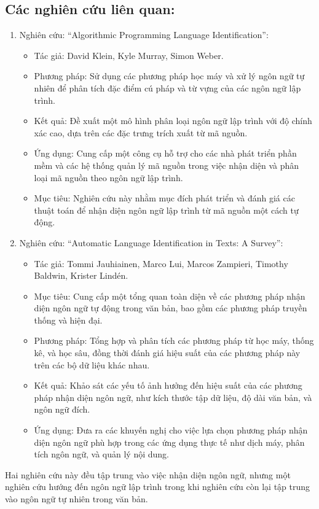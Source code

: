 \subsection{Các nghiên cứu liên quan:}

\begin{enumerate}
    \item Nghiên cứu: “Algorithmic Programming Language Identification”:
    \begin{itemize}
        \item Tác giả: David Klein, Kyle Murray, Simon Weber.
        \item  Phương pháp: Sử dụng các phương pháp học máy và xử lý ngôn ngữ tự nhiên để phân tích đặc điểm cú pháp và từ vựng của các ngôn ngữ lập trình.
        \item Kết quả: Đề xuất một mô hình phân loại ngôn ngữ lập trình với độ chính xác cao, dựa trên các đặc trưng trích xuất từ mã nguồn.
        \item  Ứng dụng: Cung cấp một công cụ hỗ trợ cho các nhà phát triển phần mềm và các hệ thống quản lý mã nguồn trong việc nhận diện và phân loại mã nguồn theo ngôn ngữ lập trình.
        \item Mục tiêu: Nghiên cứu này nhằm mục đích phát triển và đánh giá các thuật toán để nhận diện ngôn ngữ lập trình từ mã nguồn một cách tự động.
    \end{itemize}
    \item Nghiên cứu: “Automatic Language Identification in Texts: A Survey”:
    \begin{itemize}
        \item Tác giả: Tommi Jauhiainen, Marco Lui, Marcos Zampieri, Timothy Baldwin, Krister Lindén.
        \item Mục tiêu: Cung cấp một tổng quan toàn diện về các phương pháp nhận diện ngôn ngữ tự động trong văn bản, bao gồm các phương pháp truyền thống và hiện đại.
        \item Phương pháp: Tổng hợp và phân tích các phương pháp từ học máy, thống kê, và học sâu, đồng thời đánh giá hiệu suất của các phương pháp này trên các bộ dữ liệu khác nhau.
        \item Kết quả: Khảo sát các yếu tố ảnh hưởng đến hiệu suất của các phương pháp nhận diện ngôn ngữ, như kích thước tập dữ liệu, độ dài văn bản, và ngôn ngữ đích.
        \item Ứng dụng: Đưa ra các khuyến nghị cho việc lựa chọn phương pháp nhận diện ngôn ngữ phù hợp trong các ứng dụng thực tế như dịch máy, phân tích ngôn ngữ, và quản lý nội dung.
    \end{itemize}
    
\end{enumerate}

Hai nghiên cứu này đều tập trung vào việc nhận diện ngôn ngữ, nhưng một nghiên cứu hướng đến ngôn ngữ lập trình trong khi nghiên cứu còn lại tập trung vào ngôn ngữ tự nhiên trong văn bản. 
\clearpage